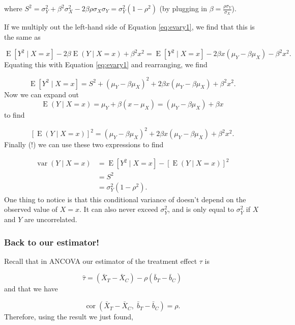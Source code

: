 \documentclass[
  openany]{book}
\theoremstyle{definition}
\theoremstyle{definition}
\theoremstyle{definition}
\theoremstyle{definition}
\theoremstyle{remark}
\begin{document}
where \(S^2 = \sigma^2_Y + \beta^2\sigma^2_X - 2\beta\rho\sigma_X\sigma_Y = \sigma^2_Y\left(1-\rho^2\right)\) (by plugging in \(\beta = \frac{\rho\sigma_Y}{\sigma_X}\)).

If we multiply out the left-hand side of Equation \eqref{eq:evary1}, we find that this is the same as

\[\operatorname{E}\left[Y^2\mid{X=x}\right] - 2\beta\operatorname{E}\left(Y\mid{X=x}\right) + \beta^2 x^2 = \operatorname{E}\left[Y^2\mid{X=x}\right] - 2\beta x\left(\mu_Y - \beta\mu_X\right) - \beta^2 x^2.\]
Equating this with Equation \eqref{eq:evary1} and rearranging, we find

\[\operatorname{E}\left[Y^2\mid{X=x}\right] = S^2 + \left(\mu_Y - \beta\mu_X\right)^2 + 2\beta x\left(\mu_Y - \beta \mu_X\right) + \beta^2x^2.\]
Now we can expand out
\[\operatorname{E}\left(Y\mid{X=x}\right) = \mu_Y + \beta\left(x-\mu_X\right) = \left(\mu_Y - \beta\mu_X\right) +\beta x\]
to find

\[\left[\operatorname{E}\left(Y\mid{X=x}\right) \right]^2  = \left(\mu_Y - \beta\mu_X\right)^2 + 2\beta x \left(\mu_Y - \beta\mu_X\right) + \beta^2 x^2.\]
Finally (!) we can use these two expressions to find

\[
\begin{aligned}
\operatorname{var}\left(Y\mid{X=x}\right) & = \operatorname{E}\left[Y^2\mid{X=x}\right] - \left[\operatorname{E}\left(Y\mid{X=x}\right)\right]^2\\
& = S^2 \\
& = \sigma_Y^2\left(1-\rho^2\right).
\end{aligned}
\]
One thing to notice is that this conditional variance of doesn't depend on the observed value of \(X=x\). It can also never exceed \(\sigma^2_Y\), and is only equal to \(\sigma^2_Y\) if \(X\) and \(Y\) are uncorrelated.

\hypertarget{back-to-our-estimator}{%
\subsubsection*{Back to our estimator!}\label{back-to-our-estimator}}

Recall that in ANCOVA our estimator of the treatment effect \(\tau\) is

\[ \hat{\tau} = \left(\bar{X}_T - \bar{X}_C\right) - \rho\left(\bar{b}_T - \bar{b}_C\right)\]
and that we have

\[\operatorname{cor}\left(\bar{X}_T - \bar{X}_C,\; \bar{b}_T - \bar{b}_C\right) = \rho.\]
Therefore, using the result we just found,
\end{document}
